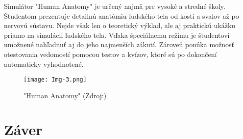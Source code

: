\documentclass[10pt,twoside,slovak,a4paper]{article}
\begin{document}
Simulátor "Human Anatomy"\cite{Antom} je určený najmä pre vysoké a stredné školy. Študentom prezentuje detailnú anatómiu ľudského tela od kostí a svalov až po nervovú sústavu. Nejde však len o teoretický výklad, ale aj praktickú ukážku priamo na simulácii ľudského tela. Vďaka špeciálnemu režimu je študentovi umožnené nahľadnuť aj do jeho najmenších zákutí. Zároveň ponúka možnosť otestovania vedomostí pomocou testov a kvízov, ktoré sú po dokončení automaticky vyhodnotené.

\begin{figure}[tbh]
	\centering
	\texttt{[image: Img-3.png]}
	\caption{"Human Anatomy" (Zdroj:\cite{Img-Antom})}
	\label{obr-3}
\end{figure}

\section{Záver}



\end{document}

